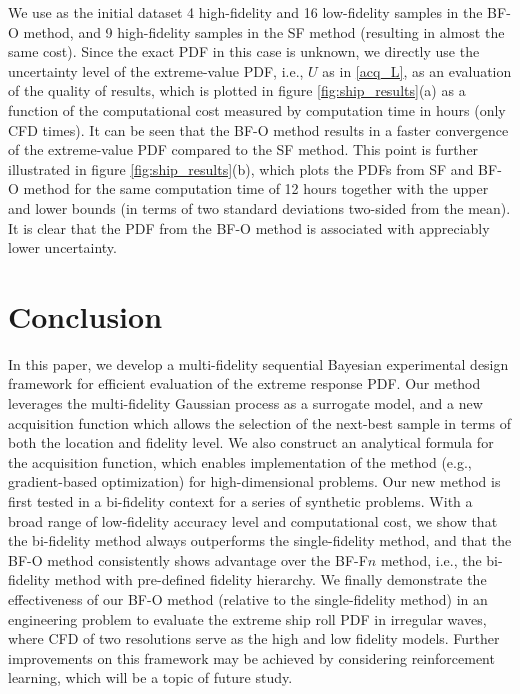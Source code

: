 \documentclass[11pt]{article}
\begin{document}
We use as the initial dataset 4 high-fidelity and 16 low-fidelity samples in the BF-O method, and 9 high-fidelity samples in the SF method (resulting in almost the same cost). Since the exact PDF in this case is unknown, we directly use the uncertainty level of the extreme-value PDF, i.e., $U$ as in \eqref{acq_L}, as an evaluation of the quality of results, which is plotted in figure \ref{fig:ship_results}(a) as a function of the computational cost measured by computation time in hours (only CFD times). It can be seen that the BF-O method results in a faster convergence of the extreme-value PDF compared to the SF method. This point is further illustrated in figure \ref{fig:ship_results}(b), which plots the PDFs from SF and BF-O method for the same computation time of 12 hours together with the upper and lower bounds (in terms of two standard deviations two-sided from the mean). It is clear that the PDF from the BF-O method is associated with appreciably lower uncertainty. 





\section{Conclusion}
In this paper, we develop a multi-fidelity sequential Bayesian experimental design framework for efficient evaluation of the extreme response PDF. Our method leverages the multi-fidelity Gaussian process as a surrogate model, and a new acquisition function which allows the selection of the next-best sample in terms of both the location and fidelity level. We also construct an analytical formula for the acquisition function, which enables implementation of the method (e.g., gradient-based optimization) for high-dimensional problems. Our new method is first tested in a bi-fidelity context for a series of synthetic problems. With a broad range of low-fidelity accuracy level and computational cost, we show that the bi-fidelity method always outperforms the single-fidelity method, and that the BF-O method consistently shows advantage over the BF-F$n$ method, i.e., the bi-fidelity method with pre-defined fidelity hierarchy. We finally demonstrate the effectiveness of our BF-O method (relative to the single-fidelity method) in an engineering problem to evaluate the extreme ship roll PDF in irregular waves, where CFD of two resolutions serve as the high and low fidelity models. Further improvements on this framework may be achieved by considering reinforcement learning, which will be a topic of future study.
\end{document}
